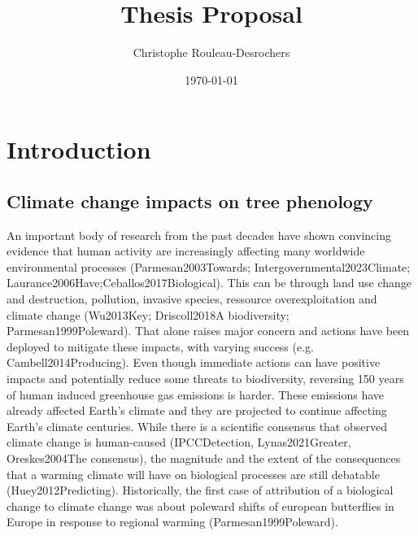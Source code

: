 \documentclass{article}
\title{Thesis Proposal}
\date{\today}
\author{Christophe Rouleau-Desrochers}
\begin{document}

\maketitle


\section{Introduction}
\subsection{Climate change impacts on tree phenology}
An important body of research from the past decades have shown convincing evidence that human activity are increasingly affecting many worldwide environmental processes (Parmesan2003Towards; Intergovernmental2023Climate; Laurance2006Have;Ceballos2017Biological). This can be through land use change and destruction, pollution, invasive species, ressource overexploitation and climate change (Wu2013Key; Driscoll2018A biodiversity; Parmesan1999Poleward). That alone raises major concern and actions have been deployed to mitigate these impacts, with varying success (e.g. Cambell2014Producing). Even though immediate actions can have positive impacts and potentially reduce some threats to biodiversity, reversing 150 years of human induced greenhouse gas emissions is harder. These emissions have already affected Earth's climate and they are projected to continue affecting Earth's climate centuries. While there is a scientific consensus that observed climate change is human-caused (IPCCDetection, Lynas2021Greater, Oreskes2004The consensus), the magnitude and the extent of the consequences that a warming climate will have on biological processes are still debatable (Huey2012Predicting). Historically, the first case of attribution of a biological change to climate change was about poleward shifts of european butterflies in Europe in response to regional warming (Parmesan1999Poleward).

\end{document}
